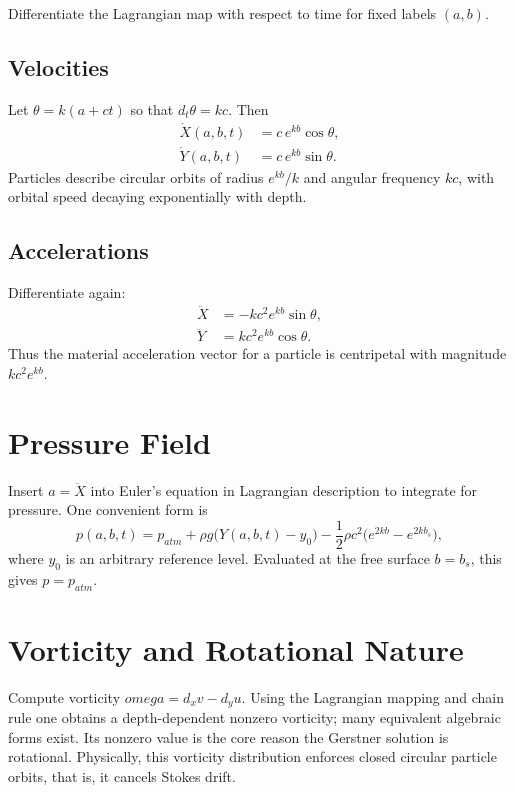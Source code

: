 \documentclass[journal,10pt,twocolumn]{IEEEtran}
\def\omega{omega}%
\def\mathbf#1{#1}%
\def\partial{d}%
\def\mathrm#1{#1}%
\def\;{ }%
\begin{document}
Differentiate the Lagrangian map with respect to time for fixed labels $(a,b)$.

\subsection{Velocities}

Let $\theta=k(a+ct)$ so that $\partial_t\theta = kc$. Then
\begin{align}
    \dot X(a,b,t) &= c\,e^{k b}\cos\theta, \label{eq:velX}\\
    \dot Y(a,b,t) &= c\,e^{k b}\sin\theta. \label{eq:velY}
\end{align}
Particles describe circular orbits of radius $e^{kb}/k$ and angular frequency $kc$, with orbital speed decaying exponentially with depth.

\subsection{Accelerations}

Differentiate again:
\begin{align}
    \ddot X &= -k c^2 e^{k b}\sin\theta, \\
    \ddot Y &= \;\;k c^2 e^{k b}\cos\theta.
\end{align}
Thus the material acceleration vector for a particle is centripetal with magnitude $k c^2 e^{k b}$.

\section{Pressure Field}

Insert $\mathbf{a}=\ddot{\mathbf{X}}$ into Euler's equation in Lagrangian description to integrate for pressure. One convenient form is
\begin{equation}
    p(a,b,t) = p_{\mathrm{atm}} + \rho g\big(Y(a,b,t)-y_0\big) - \frac{1}{2}\rho c^2\big(e^{2k b}-e^{2k b_s}\big),
    \label{eq:pressure}
\end{equation}
where $y_0$ is an arbitrary reference level. Evaluated at the free surface $b=b_s$, this gives $p=p_{\mathrm{atm}}$.

\section{Vorticity and Rotational Nature}

Compute vorticity $\omega=\partial_x v - \partial_y u$. Using the Lagrangian mapping and chain rule one obtains a depth-dependent nonzero vorticity; many equivalent algebraic forms exist. Its nonzero value is the core reason the Gerstner solution is rotational. Physically, this vorticity distribution enforces closed circular particle orbits, that is, it cancels Stokes drift.
\end{document}
